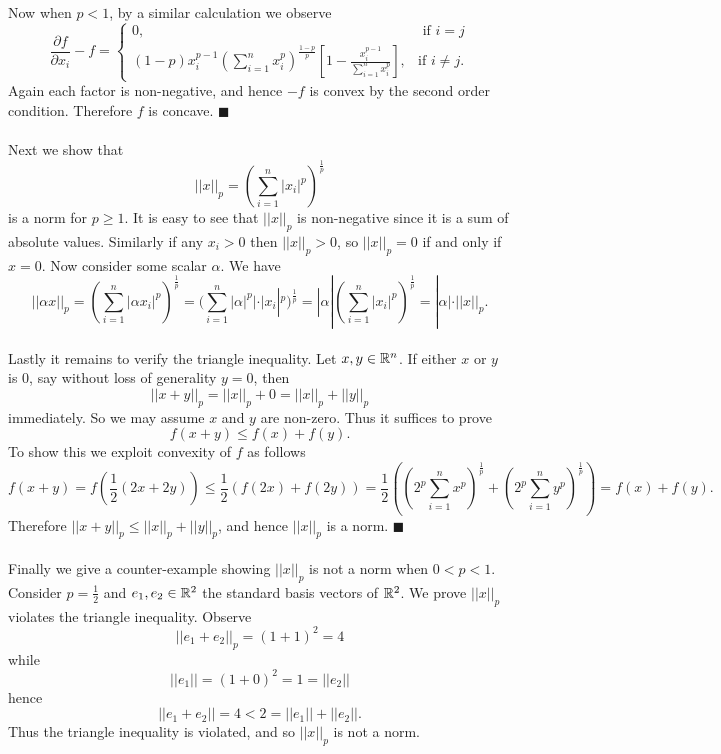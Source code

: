 \documentclass[letterpaper,12pt,oneside,onecolumn]{article}
\begin{document}
\paragraph{}
Now when $p < 1$, by a similar calculation we observe
$$\frac{\partial f}{\partial x_i} -f = \begin{cases}
0, &\text{ if } i=j \\
(1-p)x_i^{p-1}(\sum_{i=1}^n x_i^p)^\frac{1-p}{p}[1- \frac{x_i^{p-1}}{\sum_{i=1}^n x_i^p}], &\text{if } i \neq j.
\end{cases}$$
Again each factor is non-negative, and hence $-f$ is convex by the second order condition. Therefore $f$ is concave. $\blacksquare$
\paragraph{}
Next we show that
$$||x||_p = (\sum_{i=1}^n |x_i|^p)^\frac{1}{p}$$
is a norm for $p\geq 1$. It is easy to see that $||x||_p$ is non-negative since it is a sum of absolute values. Similarly if any $x_i > 0$ then $||x||_p > 0$, so $||x||_p = 0$ if and only if $x = 0$. Now consider some scalar $\alpha$. We have
$$||\alpha x||_p = (\sum_{i=1}^n |\alpha x_i|^p)^\frac{1}{p} = (\sum_{i=1}^n |\alpha|^p|\cdot |x_i|^p)^\frac{1}{p} = |\alpha|(\sum_{i=1}^n |x_i|^p)^\frac{1}{p} = |\alpha|\cdot ||x||_p.$$
\paragraph{}
Lastly it remains to verify the triangle inequality. Let $x, y \in \mathbb{R}^n$. If either $x$ or $y$ is $0$, say without loss of generality $y=0$, then 
$$||x + y||_p = ||x||_p + 0 = ||x||_p + ||y||_p$$
immediately. So we may assume $x$ and $y$ are non-zero. Thus it suffices to prove
$$f(x+y) \leq f(x) + f(y).$$
To show this we exploit convexity of $f$ as follows
$$f(x+y) = f(\frac{1}{2}(2x+2y)) \leq \frac{1}{2}(f(2x) + f(2y)) = \frac{1}{2} ((2^p\sum_{i=1}^n x^p)^\frac{1}{p} +(2^p\sum_{i=1}^n y^p)^\frac{1}{p}) = f(x) + f(y).$$
Therefore $||x + y||_p \leq ||x||_p + ||y||_p$, and hence $||x||_p$ is a norm. $\blacksquare$
\paragraph{}
Finally we give a counter-example showing $||x||_p$ is not a norm when $0 < p < 1$. Consider $p =\frac{1}{2}$ and $e_1, e_2 \in \mathbb{R}^2$ the standard basis vectors of $\mathbb{R}^2$. We prove $||x||_p$ violates the triangle inequality. Observe
$$||e_1 + e_2 ||_p = (1 + 1)^2 = 4$$
while 
$$||e_1|| = (1+0)^2 = 1 = ||e_2||$$
hence 
$$||e_1 + e_2||  = 4 < 2 = ||e_1|| + ||e_2||.$$
Thus the triangle inequality is violated, and so $||x||_p$ is not a norm.
\end{document}
